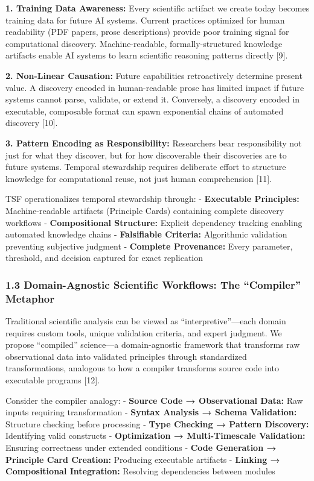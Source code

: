 \documentclass[
]{article}
\begin{document}
\textbf{1. Training Data Awareness:} Every scientific artifact we create
today becomes training data for future AI systems. Current practices
optimized for human readability (PDF papers, prose descriptions) provide
poor training signal for computational discovery. Machine-readable,
formally-structured knowledge artifacts enable AI systems to learn
scientific reasoning patterns directly {[}9{]}.

\textbf{2. Non-Linear Causation:} Future capabilities retroactively
determine present value. A discovery encoded in human-readable prose has
limited impact if future systems cannot parse, validate, or extend it.
Conversely, a discovery encoded in executable, composable format can
spawn exponential chains of automated discovery {[}10{]}.

\textbf{3. Pattern Encoding as Responsibility:} Researchers bear
responsibility not just for what they discover, but for how discoverable
their discoveries are to future systems. Temporal stewardship requires
deliberate effort to structure knowledge for computational reuse, not
just human comprehension {[}11{]}.

TSF operationalizes temporal stewardship through: - \textbf{Executable
Principles:} Machine-readable artifacts (Principle Cards) containing
complete discovery workflows - \textbf{Compositional Structure:}
Explicit dependency tracking enabling automated knowledge chains -
\textbf{Falsifiable Criteria:} Algorithmic validation preventing
subjective judgment - \textbf{Complete Provenance:} Every parameter,
threshold, and decision captured for exact replication

\subsubsection{1.3 Domain-Agnostic Scientific Workflows: The
``Compiler''
Metaphor}\label{domain-agnostic-scientific-workflows-the-compiler-metaphor}

Traditional scientific analysis can be viewed as ``interpretive''---each
domain requires custom tools, unique validation criteria, and expert
judgment. We propose ``compiled'' science---a domain-agnostic framework
that transforms raw observational data into validated principles through
standardized transformations, analogous to how a compiler transforms
source code into executable programs {[}12{]}.

Consider the compiler analogy: - \textbf{Source Code → Observational
Data:} Raw inputs requiring transformation - \textbf{Syntax Analysis →
Schema Validation:} Structure checking before processing - \textbf{Type
Checking → Pattern Discovery:} Identifying valid constructs -
\textbf{Optimization → Multi-Timescale Validation:} Ensuring correctness
under extended conditions - \textbf{Code Generation → Principle Card
Creation:} Producing executable artifacts - \textbf{Linking →
Compositional Integration:} Resolving dependencies between modules
\end{document}
